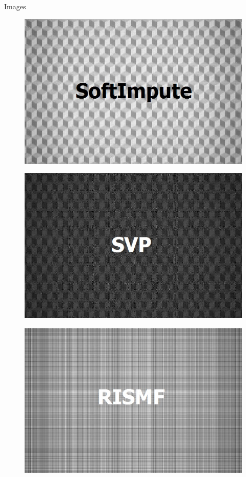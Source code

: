 \documentclass{beamer}
\begin{document}
\begin{frame}{Images}
\begin{multicols}{3}
		\begin{figure}[h]
			\centering
			\includegraphics[width=\linewidth]{./../data/images/presentation/with_capture/p4_2.jpg}
		\end{figure}
		\vspace{-0.4cm}
		\begin{figure}[h]
			\centering
			\includegraphics[width=\linewidth]{./../data/images/presentation/with_capture/p4_3.jpg}
		\end{figure}
		\vspace{-0.4cm}
		\begin{figure}[h]
			\centering
			\includegraphics[width=\linewidth]{./../data/images/presentation/with_capture/p4_4.jpg}

\end{figure}
\end{multicols}
\end{frame}
\end{document}
